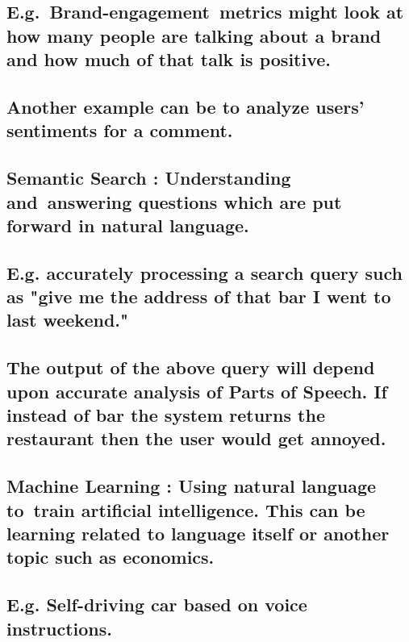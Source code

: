 \documentclass{article} %
\begin{document}
\noindent 
\subsection{E.g.~Brand-engagement~metrics might look at how many people are talking about a brand and how much of that talk is positive.}

\noindent 
\subsection{Another example can be to analyze users' sentiments for a comment.}

\noindent 
\subsection{}


\subsection{ Semantic Search : Understanding and~answering questions which are put forward in natural language. }

\noindent 
\subsection{E.g. accurately processing a search query such as "give me the address of that bar I went to last weekend."}

\noindent 
\subsection{The output of the above query will depend upon accurate analysis of Parts of Speech. If instead of bar the system returns the restaurant then the user would get annoyed.}

\noindent 
\subsection{  }


\subsection{ Machine Learning : Using natural language to~train artificial intelligence. This can be learning related to language itself or another topic such as economics.}

\noindent 
\subsection{E.g. Self-driving car based on voice instructions.}
\end{document}
